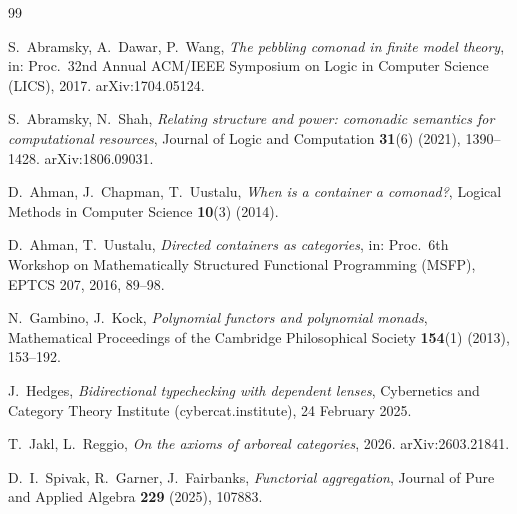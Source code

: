 \documentclass[11pt,reqno]{amsart}
\theoremstyle{plain}
\theoremstyle{definition}
\begin{document}
\begin{thebibliography}{99}

S.~Abramsky, A.~Dawar, P.~Wang,
\emph{The pebbling comonad in finite model theory},
in: Proc.\ 32nd Annual ACM/IEEE Symposium on Logic in Computer Science (LICS), 2017.
arXiv:1704.05124.

S.~Abramsky, N.~Shah,
\emph{Relating structure and power: comonadic semantics for computational resources},
Journal of Logic and Computation \textbf{31}(6) (2021), 1390--1428.
arXiv:1806.09031.

D.~Ahman, J.~Chapman, T.~Uustalu,
\emph{When is a container a comonad?},
Logical Methods in Computer Science \textbf{10}(3) (2014).

D.~Ahman, T.~Uustalu,
\emph{Directed containers as categories},
in: Proc.\ 6th Workshop on Mathematically Structured Functional Programming (MSFP), EPTCS 207, 2016,
89--98.

N.~Gambino, J.~Kock,
\emph{Polynomial functors and polynomial monads},
Mathematical Proceedings of the Cambridge Philosophical Society \textbf{154}(1) (2013), 153--192.

J.~Hedges,
\emph{Bidirectional typechecking with dependent lenses},
Cybernetics and Category Theory Institute (cybercat.institute), 24 February 2025.

T.~Jakl, L.~Reggio,
\emph{On the axioms of arboreal categories},
2026. arXiv:2603.21841.

D.~I.~Spivak, R.~Garner, J.~Fairbanks,
\emph{Functorial aggregation},
Journal of Pure and Applied Algebra \textbf{229} (2025), 107883.

\end{thebibliography}
\end{document}
